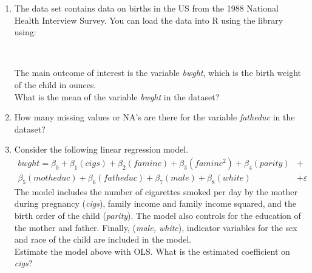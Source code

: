 \def\examid{26101200002}

\begin{enumerate}
\item {}
The data set  contains data on births in the US from the 1988 National Health Interview Survey. You can load the data into R using the  library using:

\medskip
{}\\
\medskip

The main outcome of interest is the variable \textit{bwght}, which is the birth weight of the child in ounces.\\
What is the mean of the variable \textit{bwght} in the dataset?

\item How many missing values or NA's are there for the variable \textit{fatheduc} in the dataset?

\item Consider the following linear regression model.
\[\begin{aligned}
bwght = \beta_0 + \beta_1(cigs) + \beta_2(faminc) + \beta_3(faminc^2) + \beta_4(parity) &+ \\
\beta_5(motheduc) + \beta_6(fatheduc) + \beta_7(male) + \beta_8(white) &+ \varepsilon
\end{aligned}\]
The model includes the number of cigarettes smoked per day by the mother during pregnancy (\textit{cigs}), family income and family income squared, and the birth order of the child (\textit{parity}). The model also controls for the education of the mother and father. Finally, (\textit{male, white}), indicator variables for the sex and race of the child are included in the model.\\
Estimate the model above with OLS. What is the estimated coefficient on \textit{cigs}?


\end{enumerate}
